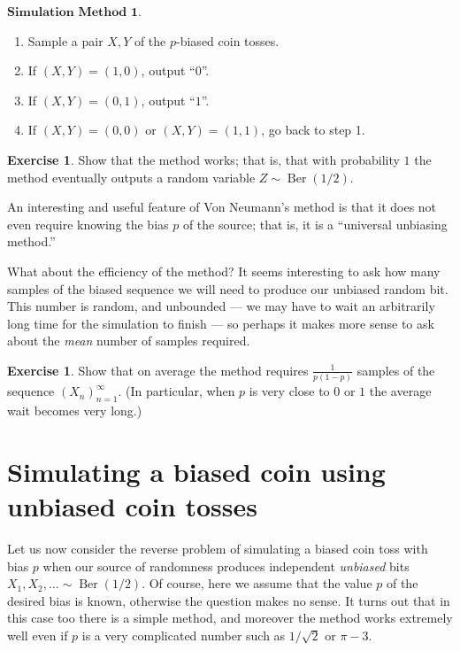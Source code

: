 \documentclass[11pt]{report}
\theoremstyle{plain}
\theoremstyle{definition}
\newtheorem{xexercise}[thm]{Exercise}
\begin{document}
$\textbf{Simulation Method 1.}$

\begin{enumerate}[label=\arabic*.]
\item Sample a pair $X,Y$ of the $p$-biased coin tosses.

\item If $(X,Y)=(1,0)$, output ``$0$''.

\item If $(X,Y)=(0,1)$, output ``$1$''.

\item If $(X,Y)=(0,0)$ or $(X,Y)=(1,1)$, go back to step 1.
\end{enumerate}

\begin{xexercise}
Show that the method works; that is, that with
probability $1$ the method eventually outputs a
random variable $Z \sim \operatorname{Ber}(1/2)$.
\end{xexercise}

\noindent An interesting and useful feature of Von Neumann's
method is that it does not even require knowing the
bias $p$ of the source; that is, it is a ``universal
unbiasing method.''

What about the efficiency of the method? It seems
interesting to ask how many samples of the biased
sequence we will need to produce our unbiased random
bit. This number is random, and unbounded --- we may
have to wait an arbitrarily long time for the
simulation to finish --- so perhaps it makes more
sense to ask about the \emph{mean} number of samples
required.

\begin{xexercise}
Show that on average the method requires
$\frac{1}{p(1-p)}$ samples of the sequence
$(X_n)_{n=1}^\infty$. (In particular, when $p$ is
very close to $0$ or $1$ the average wait becomes
very long.)
\end{xexercise}

\section{Simulating a biased coin using unbiased coin tosses}

Let us now consider the reverse problem of simulating
a biased coin toss with bias $p$ when our source of
randomness produces independent \emph{unbiased} bits
$X_1,X_2,\ldots \sim \operatorname{Ber}(1/2)$. Of
course, here we assume that the value $p$ of the
desired bias is known, otherwise the question makes no
sense. It turns out that in this case too there is a
simple method, and moreover the method works extremely
well even if $p$ is a very complicated number such as
$1/\sqrt{2}$ or $\pi-3$.
\end{document}
